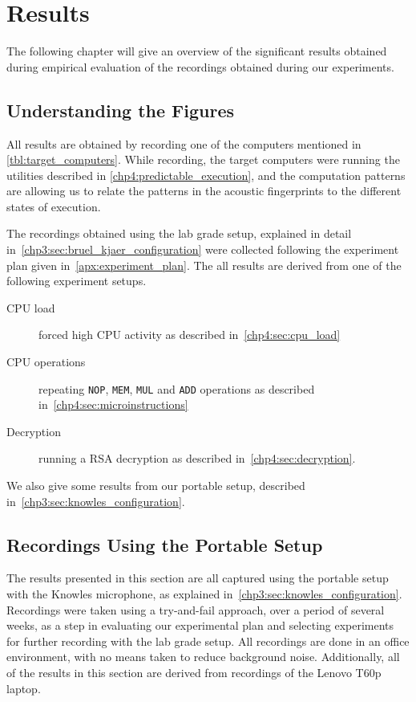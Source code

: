 \chapter{Results}
\label{chp5:results}
The following chapter will give an overview of the significant results obtained during empirical evaluation of the recordings obtained during our experiments.

\section{Understanding the Figures}
All results are obtained by recording one of the computers mentioned in \autoref{tbl:target_computers}.
While recording, the target computers were running the utilities described in \autoref{chp4:predictable_execution}, and the computation patterns are allowing us to relate the 
patterns in the acoustic fingerprints to the different states of execution.

The recordings obtained using the lab grade setup, explained in detail in~\autoref{chp3:sec:bruel_kjaer_configuration}  were collected following the experiment plan given in~\autoref{apx:experiment_plan}. 
The all results are derived from one of the following experiment setups.

\begin{description}
    \item[CPU load] forced high CPU activity as described in~\autoref{chp4:sec:cpu_load}
    \item[CPU operations] repeating \texttt{NOP}, \texttt{MEM}, \texttt{MUL} and \texttt{ADD} operations as described in~\autoref{chp4:sec:microinstructions}
    \item[Decryption] running a RSA decryption as described in~\autoref{chp4:sec:decryption}.
\end{description}

We also give some results from our portable setup, described in~\autoref{chp3:sec:knowles_configuration}.

\section{Recordings Using the Portable Setup}\label{chp5:sec:knowles_results}
The results presented in this section are all captured using the portable setup with the Knowles microphone, as explained in~\autoref{chp3:sec:knowles_configuration}.
Recordings were taken using a try-and-fail approach, over a period of several weeks, as a step in evaluating our experimental plan and selecting experiments for further recording with the lab grade setup.
All recordings are done in an office environment, with no means taken to reduce background noise.
Additionally, all of the results in this section are derived from recordings of the Lenovo T60p laptop.

